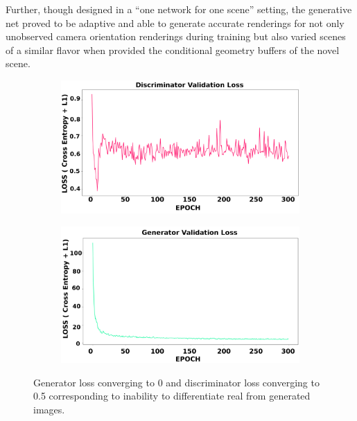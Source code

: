 Further, though designed in a ``one network for one scene'' setting, the generative net proved to be adaptive and able to generate accurate renderings for not only unobserved camera orientation renderings during training but also varied scenes of a similar flavor when provided the conditional geometry buffers of the novel scene. 
\begin{figure}
\centering
\begin{subfigure}{.5\textwidth}
\centering
\includegraphics[width=.9\textwidth]{discrimloss2.png}
\end{subfigure}
\begin{subfigure}{.5\textwidth}
\centering
\includegraphics[width=.9\textwidth]{genloss2.png}
\end{subfigure}
\caption{Generator loss converging to 0 and discriminator loss converging to 0.5 corresponding to inability to differentiate real from generated images.}
\end{figure}











